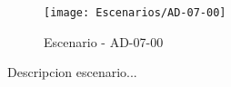 \begin{figure}[H]
\centering
\texttt{[image: Escenarios/AD-07-00]}
\caption{Escenario - AD-07-00}
\label{fig:AD-07-00}
\end{figure}

Descripcion escenario...
\clearpage
